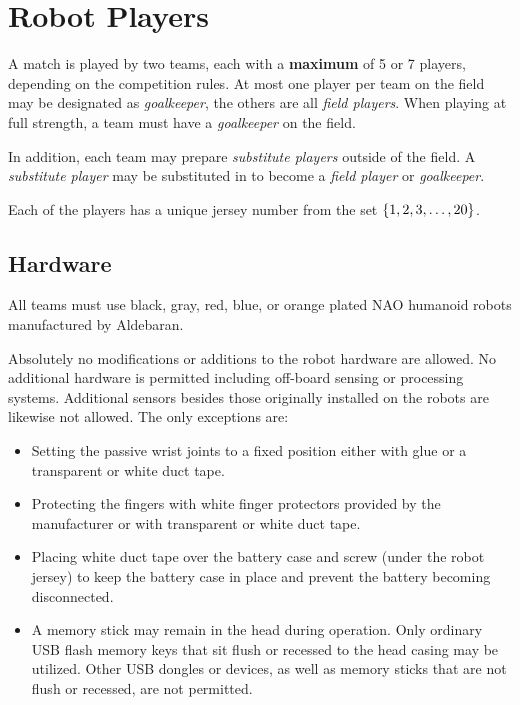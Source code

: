\section{Robot Players}
\label{sec:robot_players}

A match is played by two teams, each with a \textbf{maximum} of 5 or 7 players, depending on the competition rules.
At most one player per team on the field may be designated as \emph{goalkeeper}, the others are all \emph{field players}.
When playing at full strength, a team must have a \emph{goalkeeper} on the field.

In addition, each team may prepare \emph{substitute players} outside of the field.
A \emph{substitute player} may be substituted in to become a \emph{field player} or \emph{goalkeeper}.

Each of the players has a unique jersey number from the set $\{1, 2, 3, \ldots, 20\}$.

\subsection{Hardware}
\label{sec:hardware}

All teams must use black, gray, red, blue, or orange plated NAO humanoid robots manufactured by Aldebaran.

Absolutely no modifications or additions to the robot hardware are allowed.
No additional hardware is permitted including off-board sensing or processing systems.
Additional sensors besides those originally installed on the robots are likewise not allowed.
The only exceptions are:

\begin{itemize}
  \item Setting the passive wrist joints to a fixed position either with glue or a transparent or white duct tape.
  \item Protecting the fingers with white finger protectors provided by the manufacturer or with transparent or white duct tape.
  \item Placing white duct tape over the battery case and screw (under the robot jersey) to keep the battery case in place and prevent the battery becoming disconnected.
  \item A memory stick may remain in the head during operation.
    Only ordinary USB flash memory keys that sit flush or recessed to the head casing may be utilized.
    Other USB dongles or devices, as well as memory sticks that are not flush or recessed, are not permitted.
\end{itemize}

